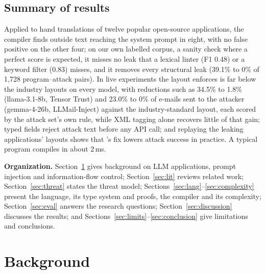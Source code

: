 \documentclass[journal]{IEEEtran}
\begin{document}
\subsection{Summary of results}
Applied to hand translations of twelve popular open-source applications, the compiler finds outside text reaching the system prompt in eight, with no false positive on the other four; on our own labelled corpus, a sanity check where a perfect score is expected, it misses no leak that a lexical linter (F1 0.48) or a keyword filter (0.83) misses, and it removes every structural leak (39.1\% to 0\% of 1{,}728 program--attack pairs). In live experiments the layout \TL{} enforces is far below the industry layouts on every model, with reductions such as 34.5\% to 1.8\% (llama-3.1-8b, Tensor Trust) and 23.0\% to 0\% of e-mails sent to the attacker (gemma-4-26b, LLMail-Inject) against the industry-standard layout, each scored by the attack set's own rule, while XML tagging alone recovers little of that gain; typed fields reject attack text before any API call; and replaying the leaking applications' layouts shows that \TL{}'s fix lowers attack success in practice. A typical program compiles in about 2\,ms.

\textbf{Organization.} Section~\ref{sec:background} gives background on LLM applications, prompt injection and information-flow control; Section~\ref{sec:lit} reviews related work; Section~\ref{sec:threat} states the threat model; Sections~\ref{sec:lang}--\ref{sec:complexity} present the language, its type system and proofs, the compiler and its complexity; Section~\ref{sec:eval} answers the research questions; Section~\ref{sec:discussion} discusses the results; and Sections~\ref{sec:limits}--\ref{sec:conclusion} give limitations and conclusions.

\section{Background}\label{sec:background}
\end{document}
